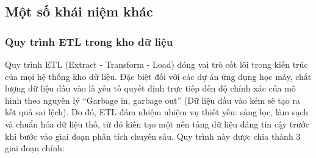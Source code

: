 \newpage

\subsection{Một số khái niệm khác}

\subsubsection{Quy trình ETL trong kho dữ liệu}
Quy trình ETL (Extract - Transform - Load) đóng vai trò cốt lõi trong kiến trúc của mọi hệ thống kho dữ liệu. Đặc biệt đối với các dự án ứng dụng học máy, chất lượng dữ liệu đầu vào là yếu tố quyết định trực tiếp đến độ chính xác của mô hình theo nguyên lý ``Garbage in, garbage out'' (Dữ liệu đầu vào kém sẽ tạo ra kết quả sai lệch). Do đó, ETL đảm nhiệm nhiệm vụ thiết yếu: sàng lọc, làm sạch và chuẩn hóa dữ liệu thô, từ đó kiến tạo một nền tảng dữ liệu đáng tin cậy trước khi bước vào giai đoạn phân tích chuyên sâu. Quy trình này được chia thành 3 giai đoạn chính:

